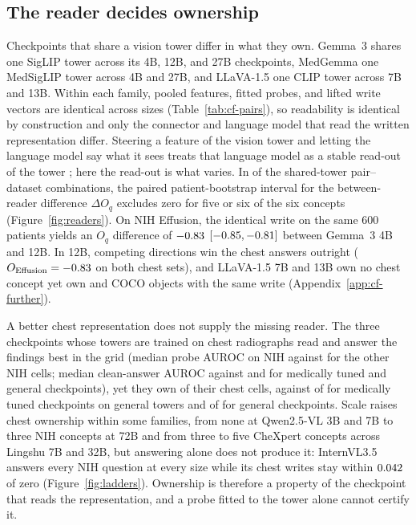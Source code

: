 \documentclass{article}
\begin{document}
\subsection{The reader decides ownership}
\label{sec:reader}

Checkpoints that share a vision tower differ in what they own. Gemma~3 shares one SigLIP tower across its 4B, 12B, and 27B checkpoints, MedGemma one MedSigLIP tower across 4B and 27B, and LLaVA-1.5 one CLIP tower across 7B and 13B. Within each family, pooled features, fitted probes, and lifted write vectors are identical across sizes (Table~\ref{tab:cf-pairs}), so readability is identical by construction and only the connector and language model that read the written representation differ. Steering a feature of the vision tower and letting the language model say what it sees treats that language model as a stable read-out of the tower \citep{ferrando2026explain}; here the read-out is what varies. In \cfPairsFiveOrSix{} of the \cfPairsN{} shared-tower pair--dataset combinations, the paired patient-bootstrap interval for the between-reader difference $\Delta O_q$ excludes zero for five or six of the six concepts (Figure~\ref{fig:readers}). On NIH Effusion, the identical write on the same 600 patients yields an $O_q$ difference of $-0.83$ $[-0.85,-0.81]$ between Gemma~3 4B and 12B. In 12B, competing directions win the chest answers outright ($O_{\mathrm{Effusion}}=-0.83$ on both chest sets), and LLaVA-1.5 7B and 13B own no chest concept yet own \cfLlavaSevenCoco{} and \cfLlavaThirteenCoco{} COCO objects with the same write (Appendix~\ref{app:cf-further}).

A better chest representation does not supply the missing reader. The three checkpoints whose towers are trained on chest radiographs read and answer the findings best in the grid (median probe AUROC \cfSpecTowerProbeAuroc{} on NIH against \cfSpecRestProbeAuroc{} for the other NIH cells; median clean-answer AUROC \cfSpecTowerAnsAuroc{} against \cfSpecMedAnsAuroc{} and \cfSpecGenAnsAuroc{} for medically tuned and general checkpoints), yet they own \cfSpecTowerOwned{} of their \cfSpecTowerN{} chest cells, against \cfSpecMedOwned{} of \cfSpecMedN{} for medically tuned checkpoints on general towers and \cfSpecGenOwned{} of \cfSpecGenN{} for general checkpoints. Scale raises chest ownership within some families, from none at Qwen2.5-VL 3B and 7B to three NIH concepts at 72B and from three to five CheXpert concepts across Lingshu 7B and 32B, but answering alone does not produce it: InternVL3.5 answers every NIH question at every size while its chest writes stay within $0.042$ of zero (Figure~\ref{fig:ladders}). Ownership is therefore a property of the checkpoint that reads the representation, and a probe fitted to the tower alone cannot certify it.
\end{document}
